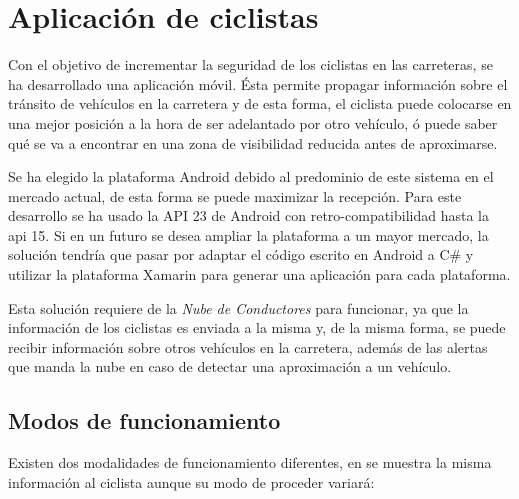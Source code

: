 \section{Aplicación de ciclistas}\label{section:appCiclistas}
Con el objetivo de incrementar la seguridad de los ciclistas en las carreteras, se
ha desarrollado una aplicación móvil. Ésta permite propagar información sobre el
tránsito de vehículos en la carretera y de esta forma, el ciclista puede colocarse
en una mejor posición a la hora de ser adelantado por otro vehículo,
ó puede saber qué se va a encontrar en una zona de visibilidad reducida antes de
aproximarse.

Se ha elegido la plataforma Android debido al predominio de este sistema en el mercado
actual, de esta forma se puede maximizar la recepción. Para este desarrollo se ha
usado la API 23 de Android con retro-compatibilidad hasta la \gls{api} 15. Si en
un futuro se desea ampliar la plataforma a un mayor mercado, la solución tendría
que pasar por adaptar el código escrito en Android a C\# y utilizar la plataforma
Xamarin para generar una aplicación para cada plataforma.

Esta solución requiere de la \emph{Nube de Conductores} para funcionar, ya que la
información de los ciclistas es enviada a la misma y, de la misma forma, se puede
recibir información sobre otros vehículos en la carretera, además de las alertas
que manda la nube en caso de detectar una aproximación a un vehículo.

\subsection{Modos de funcionamiento}\label{ssection:commHUB}
Existen dos modalidades de funcionamiento diferentes, en se muestra la misma
información al ciclista aunque su modo de proceder variará:

